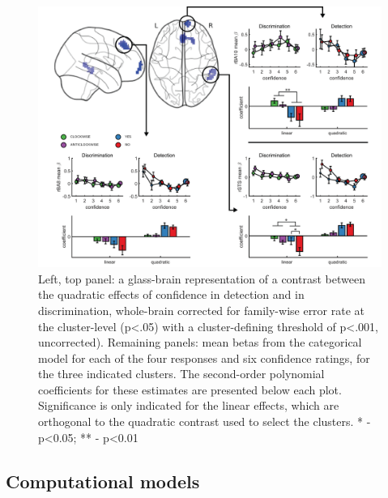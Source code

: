 \documentclass[12pt,twoside]{reedthesis}
\begin{document}
\begin{figure}
\includegraphics[width=\linewidth]{figure/ch3/figure5} \caption[Quadratic effect of confidence]{Left, top panel: a glass-brain representation of a contrast between the quadratic effects of confidence in detection and in discrimination, whole-brain corrected for family-wise error rate at the cluster-level (p<.05)  with a cluster-defining threshold of p<.001, uncorrected). Remaining panels: mean betas from the categorical model for each of the four responses and six confidence ratings, for the three indicated clusters. The second-order polynomial coefficients for these estimates are presented below each plot. Significance is only indicated for the linear effects, which are orthogonal to the quadratic contrast used to select the clusters. * - p<0.05; ** - p<0.01}\label{fig:ch3-exp1-quadConf}
\end{figure}
\hypertarget{computational-models}{%
\subsection{Computational models}\label{computational-models}}
\end{document}
